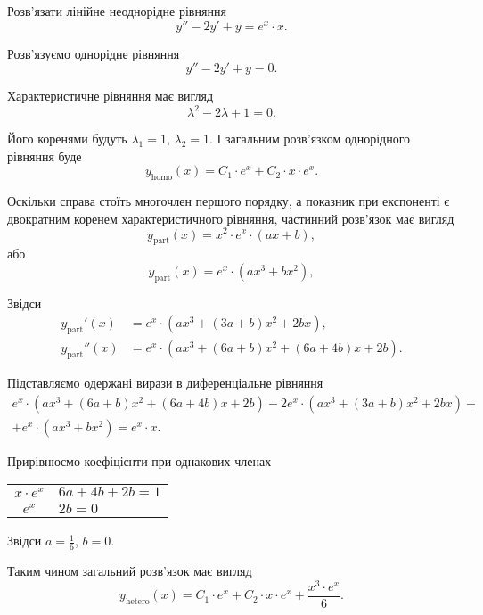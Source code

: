 \begin{example}
	Розв'язати лінійне неоднорідне рівняння \[ y'' - 2 y' + y = e^x \cdot x.\]
\end{example}
\begin{solution}
	Розв'язуємо однорідне рівняння
	\begin{equation*}
		y'' - 2 y' + y = 0.
	\end{equation*}
	
	Характеристичне рівняння має вигляд
	\begin{equation*}
		\lambda^2 - 2 \lambda + 1 = 0.
	\end{equation*}
	
	Його коренями будуть $\lambda_1 = 1$, $\lambda_2 = 1$. І загальним роз\-в'яз\-ком однорідного рівняння буде
	\begin{equation*}
		y_{\text{homo}}(x) = C_1 \cdot e^x + C_2 \cdot x \cdot e^x.
	\end{equation*}

	Оскільки справа стоїть многочлен першого порядку, а показник при експоненті є двократним коренем характеристичного рівняння, частинний розв'язок має вигляд
	\begin{equation*}
		y_{\text{part}}(x) = x^2 \cdot e^x \cdot (a x + b),
	\end{equation*}
	або
	\begin{equation*}
		y_{\text{part}}(x) = e^x \cdot (a x^3 + b x^2),
	\end{equation*}

	Звідси
	\begin{align*}
		y_{\text{part}}'(x) &= e^x \cdot (a x^3 + (3 a + b) x^2 + 2 b x), \\
		y_{\text{part}}''(x) &= e^x \cdot (a x^3 + (6 a + b) x^2 + (6 a + 4 b) x + 2 b).
	\end{align*}

	Підставляємо одержані вирази в диференціальне рівняння
	\begin{multline*}
		e^x \cdot (a x^3 + (6 a + b) x^2 + (6 a + 4 b) x + 2 b) - 2 e^x \cdot (a x^3 + (3 a + b) x^2 + 2 b x) + \\ + e^x \cdot (a x^3 + b x^2) = e^x \cdot x.
	\end{multline*}

	Прирівнюємо коефіцієнти при однакових членах
	\begin{table}[H]
		\centering
		\begin{tabular}{c|l}
			$x \cdot e^x$ & $6 a + 4 b + 2 b = 1$ \\
			$e^x$ & $2 b = 0$
		\end{tabular}
	\end{table}

	Звідси $a = \frac16$, $b = 0$. \parvskip

	Таким чином загальний розв'язок має вигляд
	\begin{equation}
		y_{\text{hetero}}(x) = C_1 \cdot e^x + C_2 \cdot x \cdot e^x + \frac{x^3 \cdot e^x}{6}.
	\end{equation}
\end{solution}

